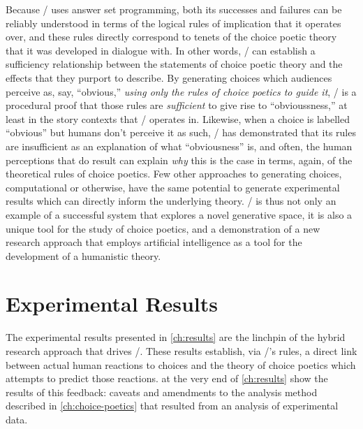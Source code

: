 Because \dunyazad/ uses answer set programming, both its successes and failures can be reliably understood in terms of the logical rules of implication that it operates over, and these rules directly correspond to tenets of the choice poetic theory that it was developed in dialogue with.
%
In other words, \dunyazad/ can establish a sufficiency relationship between the statements of choice poetic theory and the effects that they purport to describe.
%
By generating choices which audiences perceive as, say, ``obvious,'' \emph{using only the rules of choice poetics to guide it}, \dunyazad/ is a procedural proof that those rules are \emph{sufficient} to give rise to ``obvioussness,'' at least in the story contexts that \dunyazad/ operates in.
%
Likewise, when a choice is labelled ``obvious'' but humans don't perceive it as such, \dunyazad/ has demonstrated that its rules are insufficient as an explanation of what ``obviousness'' is, and often, the human perceptions that do result can explain \emph{why} this is the case in terms, again, of the theoretical rules of choice poetics.
%
Few other approaches to generating choices, computational or otherwise, have the same potential to generate experimental results which can directly inform the underlying theory.
%
\dunyazad/ is thus not only an example of a successful system that explores a novel generative space, it is also a unique tool for the study of choice poetics, and a demonstration of a new research approach that employs artificial intelligence as a tool for the development of a humanistic theory.


\section{Experimental Results}

The experimental results presented in \cref{ch:results} are the linchpin of the hybrid research approach that drives \dunyazad/.
%
These results establish, via \dunyazad/'s rules, a direct link between actual human reactions to choices and the theory of choice poetics which attempts to predict those reactions.
%
 at the very end of \cref{ch:results} show the results of this feedback: caveats and amendments to the analysis method described in \cref{ch:choice-poetics} that resulted from an analysis of experimental data.


